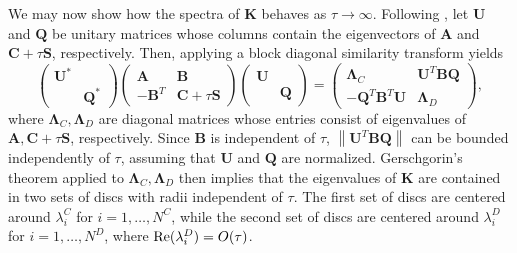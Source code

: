 \documentclass[10pt]{article}
\newcommand{\nor}[1]{\left\| #1 \right\|}
\begin{document}
We may now show how the spectra of $\bm{K}$ behaves as $\tau \rightarrow \infty$.  Following \cite{Warburton20063205}, let $\bm{U}$ and $\bm{Q}$ be unitary matrices whose columns contain the eigenvectors of $\bm{A}$ and $\bm{C} + \tau \bm{S}$, respectively.  Then, applying a block diagonal similarity transform yields
\[
\left(\begin{array}{cc}
\bm{U}^* & \\
& \bm{Q}^*
\end{array}\right)
\left(\begin{array}{cc}
\bm{A} & \bm{B}\\
-\bm{B}^T & \bm{C} + \tau \bm{S}
\end{array}\right)
\left(\begin{array}{cc}
\bm{U} & \\
& \bm{Q}
\end{array}\right)
 = \left(\begin{array}{cc}
\bm{\Lambda}_C & \bm{U}^T\bm{B}\bm{Q}\\
-\bm{Q}^T\bm{B}^T\bm{U} & \bm{\Lambda}_D
\end{array}\right),
\]
where $\bm{\Lambda}_C,\bm{\Lambda}_D$ are diagonal matrices whose entries consist of eigenvalues of $\bm{A},\bm{C} + \tau\bm{S}$, respectively.  Since $\bm{B}$ is independent of $\tau$, $\nor{\bm{U}^T\bm{B}\bm{Q}}$ can be bounded independently of $\tau$, assuming that $\bm{U}$ and $\bm{Q}$ are normalized.  Gerschgorin's theorem applied to $\bm{\Lambda}_C,\bm{\Lambda}_D$ then implies that the eigenvalues of $\bm{K}$ are contained in two sets of discs with radii independent of $\tau$.  The first set of discs are centered around $\lambda^C_i$ for $i = 1,\ldots,N^C$, while the second set of discs are centered around $\lambda^D_i$ for $i = 1,\ldots,N^D$, where ${\rm Re}(\lambda^D_i) = O(\tau)$. 
\end{document}
